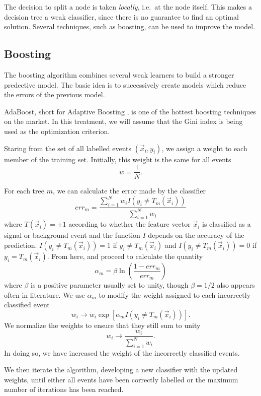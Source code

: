 \documentclass[10pt,a4paper]{book}
\begin{document}
The decision to split a node is taken \emph{locally}, i.e.\ at the node itself. This makes a decision tree a weak classifier, since there is no guarantee to find an optimal solution. Several techniques, such as boosting, can be used to improve the model. 

\subsection{Boosting}
The boosting algorithm combines several weak learners to build a stronger predective model. The basic idea is to successively create models which reduce the errors of the previous model. 

AdaBoost, short for Adaptive Boosting \cite{Freund1996ExperimentsWA}, is one of the hottest boosting techniques on the market. In this treatment, we will assume that the Gini index is being used as the optimization criterion.

Staring from the set of all labelled events $(\vec{x}_i, y_i)$, we assign a weight to each member of the training set. Initially, this weight is the same for all events
\begin{equation}
w = \frac{1}{N}.
\end{equation}

For each tree $m$, we can calculate the error made by the classifier
\begin{equation}
err_m = \frac{\sum_{i= 1}^N w_i I(y_i \neq T_m(\vec{x}_i))}{\sum_{i =1}^N w_i}
\label{error}
\end{equation}
where $T(\vec{x}_i) = \pm 1$ according to whether the feature vector $\vec{x}_i$ is classified as a signal or background event and the function $I$ depends on the accuracy of the prediction. $I(y_i \neq T_m(\vec{x}_i)) = 1$ if $y_i \neq T_m(\vec{x}_i)$ and $I(y_i \neq T_m(\vec{x}_i)) = 0$ if $y_i = T_m(\vec{x}_i)$.
From here, and proceed to calculate the quantity
\begin{equation}
\alpha_m = \beta \ln \left( \frac{1 - err_m}{err_m} \right)
\end{equation}
where $\beta$ is a positive parameter usually set to unity, though $\beta = 1/2$ also appears often in literature. We use $\alpha_m$ to modify the weight assigned to each incorrectly classified event
\begin{equation}
w_i \rightarrow w_i \exp\left[\alpha_m I(y_i \neq T_m(\vec{x}_i)) \right].
\end{equation}
We normalize the weights to ensure that they still sum to unity
\begin{equation}
w_i \rightarrow \frac{w_i}{\sum_{i=1}^N w_i}.
\end{equation}
In doing so, we have increased the weight of the incorrectly classified events. 

We then iterate the algorithm, developing a new classifier with the updated weights, until either all events have been correctly labelled or the maximum number of iterations has been reached. 
\nocite{Yang2005StudiesOB}
\end{document}
